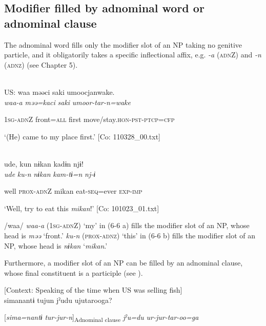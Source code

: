 \subsection{Modifier filled by adnominal word or adnominal clause}

The adnominal word fills only the modifier slot of an NP taking no genitive particle, and it obligatorily takes a specific inflectional affix, e.g. \textit{{}-a} (\textsc{adn}Z) and \textit{{}-n} (\textsc{adnz}) (see Chapter 5).

\ea\label{ex:6-6}
\ea{}\\
\gll  US:  waa  məəci  saki  umoocjanwake.\\

      \textit{waa-a}  \textit{məə=kaci}  \textit{saki}  \textit{umoor-tar-n=wake}

      1\textsc{sg}-\textsc{adn}Z  front=\textsc{all}  first  move/stay.\textsc{hon}-\textsc{pst}-\textsc{ptcp}=\textsc{cfp}

\glt ‘(He) came to my place first.’ [Co: 110328\_00.txt]
\z

 \ex{}\\
{\TM}
\gll  ude,  kun  nɨkan  kadɨn  njɨ!\\

      \textit{ude}  \textit{ku-n}  \textit{nɨkan}  \textit{kam-tɨ=n}  \textit{nj-ɨ}

      well  \textsc{prox}-\textsc{adn}Z  mikan  eat-\textsc{seq}=ever  \textsc{exp}-\textsc{imp}

\glt ‘Well, try to eat this \textit{mikan}!’ [Co: 101023\_01.txt]
\z

/waa/ \textit{waa-a} (1\textsc{sg}-\textsc{adn}Z) ‘my’ in (6-6 a) fills the modifier slot of an NP, whose head is \textit{məə} ‘front.’ \textit{ku-n} (\textsc{prox}-\textsc{adnz}) ‘this’ in (6-6 b) fills the modifier slot of an NP, whose head is \textit{nɨkan} ‘\textit{mikan}.’

  Furthermore, a modifier slot of an NP can be filled by an adnominal clause, whose final constituent is a participle (see ).

\ea\label{ex:6-7}
 [Context: Speaking of the time when US was selling fish]\\

{\TM}
\gll simanantɨ  tujun  jˀudu  ujutarooga?

    [\textit{sima=nantɨ}  \textit{tur-jur-n}]\textsubscript{Adnominal clause}  \textit{jˀu=du}  \textit{ur-jur-tar-oo=ga}

